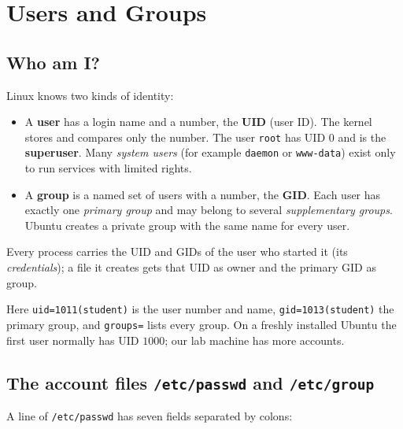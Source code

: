 \documentclass[11pt,a4paper]{article}
\newcommand{\term}[1]{\textbf{\color{mintdeep}#1}}
\begin{document}
\section{Users and Groups}

\subsection{Who am I?}
\label{sec:who}

Linux knows two kinds of identity:
\begin{itemize}
  \item A \term{user} has a login name and a number, the \term{UID} (user ID). The kernel stores and compares only the number. The user \texttt{root} has UID $0$ and is the \term{superuser}. Many \emph{system users} (for example \texttt{daemon} or \texttt{www-data}) exist only to run services with limited rights.
  \item A \term{group} is a named set of users with a number, the \term{GID}. Each user has exactly one \emph{primary group} and may belong to several \emph{supplementary groups}. Ubuntu creates a private group with the same name for every user.
\end{itemize}
Every process carries the UID and GIDs of the user who started it (its \emph{credentials}); a file it creates gets that UID as owner and the primary GID as group.



Here \texttt{uid=1011(student)} is the user number and name, \texttt{gid=1013(student)} the primary group, and \texttt{groups=} lists every group. On a freshly installed Ubuntu the first user normally has UID $1000$; our lab machine has more accounts.

\subsection{The account files \texttt{/etc/passwd} and \texttt{/etc/group}}



A line of \texttt{/etc/passwd} has seven fields separated by colons:
\end{document}
